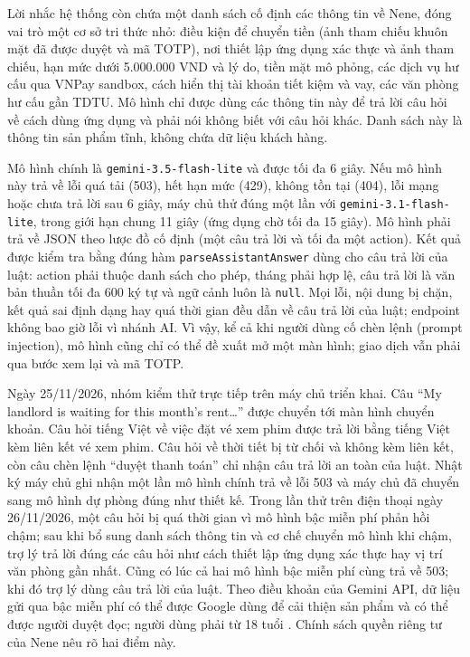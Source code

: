 Lời nhắc hệ thống còn chứa một danh sách cố định các thông tin về Nene, đóng vai trò một cơ sở tri thức nhỏ: điều kiện để chuyển tiền (ảnh tham chiếu khuôn mặt đã được duyệt và mã TOTP), nơi thiết lập ứng dụng xác thực và ảnh tham chiếu, hạn mức dưới 5.000.000 VND và lý do, tiền mặt mô phỏng, các dịch vụ hư cấu qua VNPay sandbox, cách hiển thị tài khoản tiết kiệm và vay, các văn phòng hư cấu gần TDTU. Mô hình chỉ được dùng các thông tin này để trả lời câu hỏi về cách dùng ứng dụng và phải nói không biết với câu hỏi khác. Danh sách này là thông tin sản phẩm tĩnh, không chứa dữ liệu khách hàng.

Mô hình chính là \texttt{gemini-\allowbreak{}3.5-\allowbreak{}flash-\allowbreak{}lite} và được tối đa 6 giây. Nếu mô hình này trả về lỗi quá tải (503), hết hạn mức (429), không tồn tại (404), lỗi mạng hoặc chưa trả lời sau 6 giây, máy chủ thử đúng một lần với \texttt{gemini-\allowbreak{}3.1-\allowbreak{}flash-\allowbreak{}lite}, trong giới hạn chung 11 giây (ứng dụng chờ tối đa 15 giây). Mô hình phải trả về JSON theo lược đồ cố định (một câu trả lời và tối đa một action). Kết quả được kiểm tra bằng đúng hàm \texttt{parse\allowbreak{}Assistant\allowbreak{}Answer} dùng cho câu trả lời của luật: action phải thuộc danh sách cho phép, tháng phải hợp lệ, câu trả lời là văn bản thuần tối đa 600 ký tự và ngữ cảnh luôn là \texttt{null}. Mọi lỗi, nội dung bị chặn, kết quả sai định dạng hay quá thời gian đều dẫn về câu trả lời của luật; endpoint không bao giờ lỗi vì nhánh AI. Vì vậy, kể cả khi người dùng cố chèn lệnh (prompt injection), mô hình cũng chỉ có thể đề xuất mở một màn hình; giao dịch vẫn phải qua bước xem lại và mã TOTP.

Ngày 25/11/2026, nhóm kiểm thử trực tiếp trên máy chủ triển khai. Câu ``My landlord is waiting for this month's rent\ldots'' được chuyển tới màn hình chuyển khoản. Câu hỏi tiếng Việt về việc đặt vé xem phim được trả lời bằng tiếng Việt kèm liên kết vé xem phim. Câu hỏi về thời tiết bị từ chối và không kèm liên kết, còn câu chèn lệnh ``duyệt thanh toán'' chỉ nhận câu trả lời an toàn của luật. Nhật ký máy chủ ghi nhận một lần mô hình chính trả về lỗi 503 và máy chủ đã chuyển sang mô hình dự phòng đúng như thiết kế. Trong lần thử trên điện thoại ngày 26/11/2026, một câu hỏi bị quá thời gian vì mô hình bậc miễn phí phản hồi chậm; sau khi bổ sung danh sách thông tin và cơ chế chuyển mô hình khi chậm, trợ lý trả lời đúng các câu hỏi như cách thiết lập ứng dụng xác thực hay vị trí văn phòng gần nhất. Cũng có lúc cả hai mô hình bậc miễn phí cùng trả về 503; khi đó trợ lý dùng câu trả lời của luật. Theo điều khoản của Gemini API, dữ liệu gửi qua bậc miễn phí có thể được Google dùng để cải thiện sản phẩm và có thể được người duyệt đọc; người dùng phải từ 18 tuổi \parencite{ch3-gemini-terms}. Chính sách quyền riêng tư của Nene nêu rõ hai điểm này.

